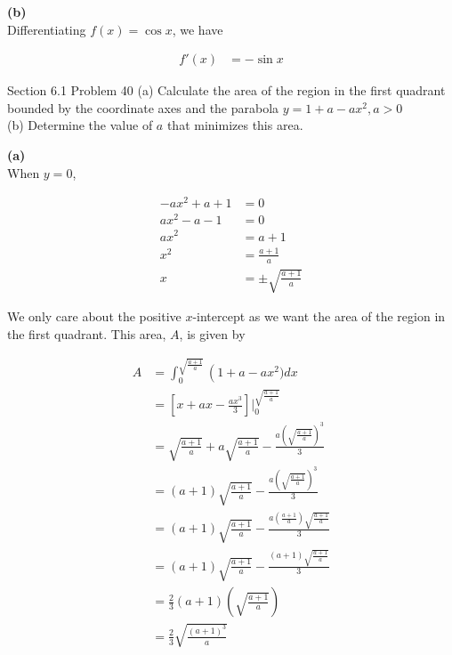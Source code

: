 \documentclass{article}
\begin{document}
    \textbf{(b)} \\
    Differentiating $f(x)=\cos{x}$, we have

    \begin{align*}
        f'(x)   &= -\sin{x}
    \end{align*}



    \begin{tbhtheorem}{Section 6.1 Problem 40}
        (a) Calculate the area of the region in the first quadrant bounded by the coordinate axes and the parabola $y=1+a-ax^2, a> 0$ \\
        (b) Determine the value of $a$ that minimizes this area.
    \end{tbhtheorem}

    \textbf{(a)} \\
    When $y=0$,

    \begin{align*}
        -ax^2 + a + 1   &= 0 \\
        ax^2 - a - 1    &= 0 \\
        ax^2            &= a + 1 \\
        x^2             &= \frac{a+1}{a} \\
        x               &= \pm \sqrt{\frac{a+1}{a}}
    \end{align*}

    We only care about the positive $x$-intercept as we want the area of the region in the first quadrant. This area, $A$, is given by

    \begin{align*}
        A   &=  \int_0^{\sqrt{\frac{a+1}{a}}} \left(1+a-ax^2)dx \\
            &=  \left[x+ax-\frac{ax^3}{3}\right]\Big|_0^{\sqrt{\frac{a+1}{a}}} \\
            &= \sqrt{\frac{a+1}{a}} + a\sqrt{\frac{a+1}{a}} - \frac{a\left(\sqrt{\frac{a+1}{a}}\right)^3}{3} \\
            &= (a+1)\sqrt{\frac{a+1}{a}} - \frac{a\left(\sqrt{\frac{a+1}{a}}\right)^3}{3} \\
            &= (a+1)\sqrt{\frac{a+1}{a}} - \frac{a\left(\frac{a+1}{a}\right)\sqrt{\frac{a+1}{a}}}{3} \\
            &= (a+1)\sqrt{\frac{a+1}{a}} - \frac{(a+1)\sqrt{\frac{a+1}{a}}}{3} \\
            &= \frac{2}{3}(a+1)\left(\sqrt{\frac{a+1}{a}}\right) \\
            &= \frac{2}{3}\sqrt{\frac{(a+1)^3}{a}}
    \end{align*}
\end{document}
